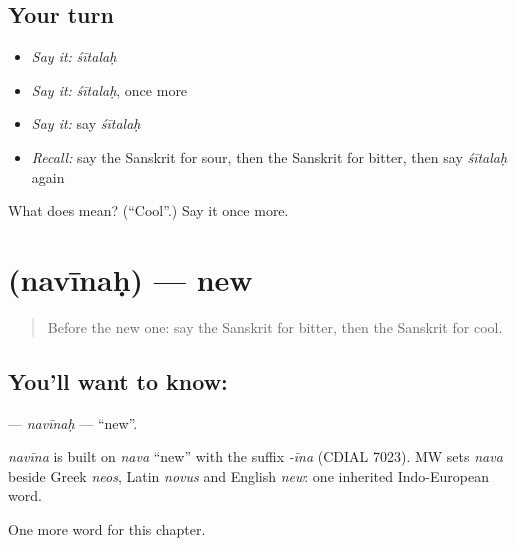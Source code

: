 \subsection*{Your turn}
\begin{itemize}
\raggedright
  \item \emph{Say it:} \emph{śītalaḥ}
  \item \emph{Say it:} \emph{śītalaḥ}, once more
  \item \emph{Say it:} say \emph{śītalaḥ}
  \item \emph{Recall:} say the Sanskrit for sour, then the Sanskrit for bitter, then say \emph{śītalaḥ} again
\end{itemize}

\begin{tcolorbox}[breakable,colback=teal!4,colframe=teal!35!black,title={Before you move on}]
What does  mean? (\textquotedblleft{}Cool\textquotedblright{}.) Say it once more.
\end{tcolorbox}
\section[\texorpdfstring{\sk{नवीनः} (navīnaḥ)}{नवीनः (navīnaḥ)}]{ (navīnaḥ) — new}

\label{lesson:SA-C129-navinah}



\begin{quote}
Before the new one: say the Sanskrit for bitter, then the Sanskrit for cool.
\end{quote}

\subsection*{You'll want to know: }
\textbf{} — \emph{navīnaḥ} — \textquotedblleft{}new\textquotedblright{}.

\begin{cousinweb}
\emph{navīna} is built on \emph{nava} \textquotedblleft{}new\textquotedblright{} with the suffix \emph{-īna} (CDIAL 7023). MW sets \emph{nava} beside Greek \emph{neos}, Latin \emph{novus} and English \emph{new}: one inherited Indo-European word.
\end{cousinweb}

\begin{grammarlens}[title={What you've built}]
One more word for this chapter.
\end{grammarlens}

